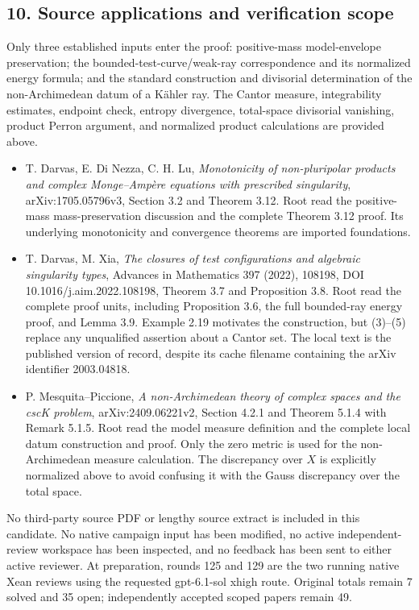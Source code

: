 \documentclass[
]{article}
\providecommand{\tightlist}{%
  \setlength{\itemsep}{0pt}\setlength{\parskip}{0pt}}
\begin{document}
\subsection{10. Source applications and verification
scope}\label{source-applications-and-verification-scope}

Only three established inputs enter the proof: positive-mass
model-envelope preservation; the bounded-test-curve/weak-ray
correspondence and its normalized energy formula; and the standard
construction and divisorial determination of the non-Archimedean datum
of a Kähler ray. The Cantor measure, integrability estimates, endpoint
check, entropy divergence, total-space divisorial vanishing, product
Perron argument, and normalized product calculations are provided above.

\begin{itemize}
\tightlist
\item
  T. Darvas, E. Di Nezza, C. H. Lu, \emph{Monotonicity of non-pluripolar
  products and complex Monge--Ampère equations with prescribed
  singularity}, arXiv:1705.05796v3, Section 3.2 and Theorem 3.12. Root
  read the positive-mass mass-preservation discussion and the complete
  Theorem 3.12 proof. Its underlying monotonicity and convergence
  theorems are imported foundations.
\item
  T. Darvas, M. Xia, \emph{The closures of test configurations and
  algebraic singularity types}, Advances in Mathematics 397 (2022),
  108198, DOI 10.1016/j.aim.2022.108198, Theorem 3.7 and Proposition
  3.8. Root read the complete proof units, including Proposition 3.6,
  the full bounded-ray energy proof, and Lemma 3.9. Example 2.19
  motivates the construction, but (3)--(5) replace any unqualified
  assertion about a Cantor set. The local text is the published version
  of record, despite its cache filename containing the arXiv identifier
  2003.04818.
\item
  P. Mesquita--Piccione, \emph{A non-Archimedean theory of complex
  spaces and the cscK problem}, arXiv:2409.06221v2, Section 4.2.1 and
  Theorem 5.1.4 with Remark 5.1.5. Root read the model measure
  definition and the complete local datum construction and proof. Only
  the zero metric is used for the non-Archimedean measure calculation.
  The discrepancy over \(X\) is explicitly normalized above to avoid
  confusing it with the Gauss discrepancy over the total space.
\end{itemize}

No third-party source PDF or lengthy source extract is included in this
candidate. No native campaign input has been modified, no active
independent-review workspace has been inspected, and no feedback has
been sent to either active reviewer. At preparation, rounds 125 and 129
are the two running native Xean reviews using the requested gpt-6.1-sol
xhigh route. Original totals remain 7 solved and 35 open; independently
accepted scoped papers remain 49.
\end{document}
